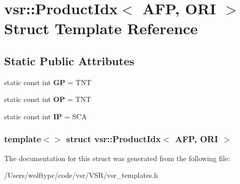 \hypertarget{structvsr_1_1_product_idx_3_01_a_f_p_00_01_o_r_i_01_4}{\section{vsr\-:\-:Product\-Idx$<$ A\-F\-P, O\-R\-I $>$ Struct Template Reference}
\label{structvsr_1_1_product_idx_3_01_a_f_p_00_01_o_r_i_01_4}
}
\subsection*{Static Public Attributes}
\begin{DoxyCompactItemize}
\item 
\hypertarget{structvsr_1_1_product_idx_3_01_a_f_p_00_01_o_r_i_01_4_ae101898bed2128ddecf3c490fc317d99}{static const int {\bfseries G\-P} = T\-N\-T}\label{structvsr_1_1_product_idx_3_01_a_f_p_00_01_o_r_i_01_4_ae101898bed2128ddecf3c490fc317d99}

\item 
\hypertarget{structvsr_1_1_product_idx_3_01_a_f_p_00_01_o_r_i_01_4_ad542ae887e77be5cc514e1db54b1d5ac}{static const int {\bfseries O\-P} = T\-N\-T}\label{structvsr_1_1_product_idx_3_01_a_f_p_00_01_o_r_i_01_4_ad542ae887e77be5cc514e1db54b1d5ac}

\item 
\hypertarget{structvsr_1_1_product_idx_3_01_a_f_p_00_01_o_r_i_01_4_ad4ea2020e65481c0446b7b7b578737f3}{static const int {\bfseries I\-P} = S\-C\-A}\label{structvsr_1_1_product_idx_3_01_a_f_p_00_01_o_r_i_01_4_ad4ea2020e65481c0446b7b7b578737f3}

\end{DoxyCompactItemize}
\subsubsection*{template$<$$>$ struct vsr\-::\-Product\-Idx$<$ A\-F\-P, O\-R\-I $>$}



The documentation for this struct was generated from the following file\-:\begin{DoxyCompactItemize}
\item 
/\-Users/wolftype/code/vsr/\-V\-S\-R/vsr\-\_\-templates.\-h\end{DoxyCompactItemize}
